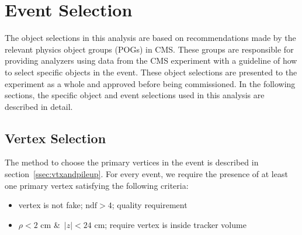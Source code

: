 \clearpage

\section{Event Selection}
The object selections in this analysis are based on recommendations made by the relevant physics object groups (POGs) in CMS.
These groups are responsible for providing analyzers using data from the CMS experiment with a guideline of how to select specific objects in the event.
These object selections are presented to the experiment as a whole and approved before being commissioned.
In the following sections, the specific object and event selections used in this analysis are described in detail.

\subsection{Vertex Selection}
The method to choose the primary vertices in the event is described in section~\ref{ssec:vtxandpileup}.
For every event, we require the presence of at least one primary vertex satisfying the following criteria:

\begin{itemize}
\item vertex is not fake; $\mathrm{ndf}>4$; quality requirement
\item $\rho<2$ cm \&\ $|z|<24$ cm; require vertex is inside tracker volume
\end{itemize}

